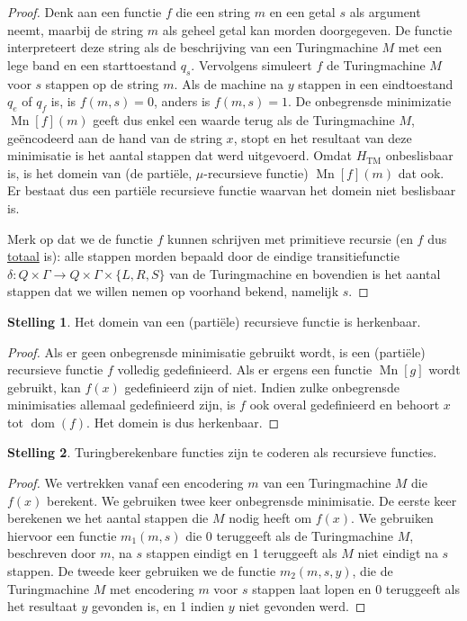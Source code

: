 \documentclass[kulak]{kulakarticle}
\theoremstyle{definition}
\newtheorem*{stelling}{Stelling}
\begin{document}
	\begin{proof}
		Denk aan een functie \(f\) die een string \(m\) en een getal \(s\) als argument neemt, maarbij de string \(m\) als geheel getal kan morden doorgegeven. De functie interpreteert deze string als de beschrijving van een Turingmachine \(M\) met een lege band en een starttoestand \(q_s\). Vervolgens simuleert \(f\) de Turingmachine \(M\) voor \(s\) stappen op de string \(m\). Als de machine na \(y\) stappen in een eindtoestand \(q_e\) of \(q_f\) is, is \(f(m,s)=0\), anders is \(f(m,s)=1\). De onbegrensde minimizatie \(\operatorname{Mn}[f](m)\) geeft dus enkel een waarde terug als de Turingmachine \(M\), geëncodeerd aan de hand van de string \(x\), stopt en het resultaat van deze minimisatie is het aantal stappen dat werd uitgevoerd. Omdat \(H_\text{TM}\) onbeslisbaar is, is het domein van (de partiële, \(\mu\)-recursieve functie) \(\operatorname{Mn}[f](m)\) dat ook. Er bestaat dus een partiële recursieve functie waarvan het domein niet beslisbaar is.

		Merk op dat we de functie \(f\) kunnen schrijven met primitieve recursie (en \(f\) dus \underline{totaal} is): alle stappen morden bepaald door de eindige transitiefunctie \(\delta : Q \times \Gamma \to Q \times \Gamma \times \{L,R,S\}\) van de Turingmachine en bovendien is het aantal stappen dat we willen nemen op voorhand bekend, namelijk \(s\).
	\end{proof}

	\begin{stelling}
		Het domein van een (partiële) recursieve functie is herkenbaar.
	\end{stelling}

	\begin{proof}
		Als er geen onbegrensde minimisatie gebruikt wordt, is een (partiële) recursieve functie \(f\) volledig gedefinieerd. Als er ergens een functie \(\operatorname{Mn}[g]\) wordt gebruikt, kan \(f(x)\) gedefinieerd zijn of niet. Indien zulke onbegrensde minimisaties allemaal gedefinieerd zijn, is \(f\) ook overal gedefinieerd en behoort \(x\) tot \(\operatorname{dom}(f)\). Het domein is dus herkenbaar.
	\end{proof}

	\begin{stelling}
		Turingberekenbare functies zijn te coderen als recursieve functies.
	\end{stelling}

	\begin{proof}
		We vertrekken vanaf een encodering \(m\) van een Turingmachine \(M\) die \(f(x)\) berekent. We gebruiken twee keer onbegrensde minimisatie. De eerste keer berekenen we het aantal stappen die \(M\) nodig heeft om \(f(x)\). We gebruiken hiervoor een functie \(m_1(m,s)\) die 0 teruggeeft als de Turingmachine \(M\), beschreven door \(m\), na \(s\) stappen eindigt en 1 teruggeeft als \(M\) niet eindigt na \(s\) stappen. De tweede keer gebruiken we de functie \(m_2(m,s,y)\), die de Turingmachine \(M\) met encodering \(m\) voor \(s\) stappen laat lopen en 0 teruggeeft als het resultaat \(y\) gevonden is, en 1 indien \(y\) niet gevonden werd.
	\end{proof}
\end{document}
